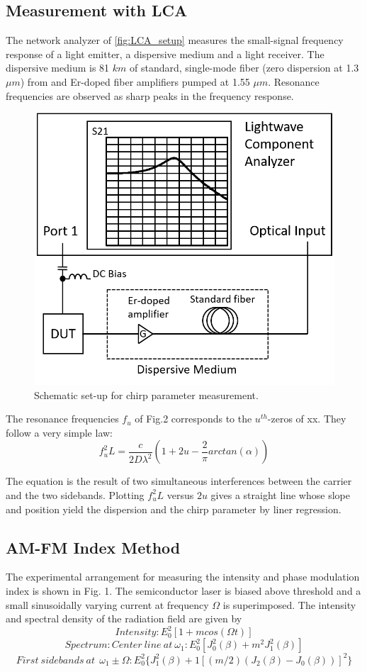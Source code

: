 \subsection{Measurement with LCA}\label{subsec:measurement_with_LCA}
The network analyzer of \autoref{fig:LCA_setup} measures the small-signal frequency response of a light emitter, a dispersive medium and a light receiver. The dispersive medium is 81 $km$ of standard, single-mode fiber (zero dispersion at 1.3 $\mu m$) from and Er-doped fiber amplifiers pumped at 1.55 $\mu m$. Resonance frequencies are observed as sharp peaks in the frequency response.
\begin{figure}[ht]
    \centering
    \includegraphics[width=.5\linewidth]{figures/LCA_setup.png}
    \caption{Schematic set-up for chirp parameter measurement.}
    \label{fig:LCA_setup}
\end{figure}

The resonance frequencies $f_u$ of Fig.2 corresponds to the $u^{th}$-zeros of xx. They follow a very simple law:
\begin{equation}
    f_u^2L=\frac{c}{2D\lambda ^2}(1+2u-\frac{2}{\pi}arctan(\alpha))
    \label{eq:LCA_equation}
\end{equation}

The equation is the result of two simultaneous interferences between the carrier and the two sidebands. Plotting $f_u^2L$ versus $2u$ gives a straight line whose slope and position yield the dispersion and the chirp parameter by liner regression.

\subsection{AM-FM Index Method}
The experimental arrangement for measuring the intensity and phase modulation index is shown in Fig. 1. The semiconductor laser is biased above threshold and a small sinusoidally varying current at frequency $\Omega$ is superimposed. The intensity and spectral density of the radiation field are given by
\begin{equation}
    Intensity: E_0^2[1+mcos(\Omega t)]
\end{equation}
\begin{equation}
    Spectrum: Center \ line \ at \ \omega_1: E_0^2[J_0^2(\beta)+m^2J_1^2(\beta)]
    \label{eq:alpha_2}
\end{equation}
\begin{equation}
    First \ sidebands \ at \
    \ \omega_1 \pm \Omega: E_0^2\big\{J_1^2(\beta)+1[(m/2)(J_2(\beta)-J_0(\beta))]^2\big\}
    \label{eq:alpha_3}
\end{equation}

